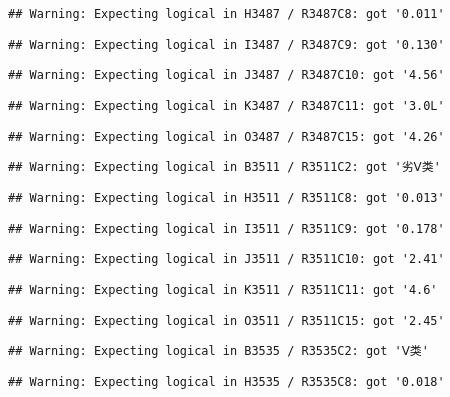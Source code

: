 \documentclass[
]{article}
\begin{document}
\begin{verbatim}
## Warning: Expecting logical in H3487 / R3487C8: got '0.011'
\end{verbatim}

\begin{verbatim}
## Warning: Expecting logical in I3487 / R3487C9: got '0.130'
\end{verbatim}

\begin{verbatim}
## Warning: Expecting logical in J3487 / R3487C10: got '4.56'
\end{verbatim}

\begin{verbatim}
## Warning: Expecting logical in K3487 / R3487C11: got '3.0L'
\end{verbatim}

\begin{verbatim}
## Warning: Expecting logical in O3487 / R3487C15: got '4.26'
\end{verbatim}

\begin{verbatim}
## Warning: Expecting logical in B3511 / R3511C2: got '劣Ⅴ类'
\end{verbatim}

\begin{verbatim}
## Warning: Expecting logical in H3511 / R3511C8: got '0.013'
\end{verbatim}

\begin{verbatim}
## Warning: Expecting logical in I3511 / R3511C9: got '0.178'
\end{verbatim}

\begin{verbatim}
## Warning: Expecting logical in J3511 / R3511C10: got '2.41'
\end{verbatim}

\begin{verbatim}
## Warning: Expecting logical in K3511 / R3511C11: got '4.6'
\end{verbatim}

\begin{verbatim}
## Warning: Expecting logical in O3511 / R3511C15: got '2.45'
\end{verbatim}

\begin{verbatim}
## Warning: Expecting logical in B3535 / R3535C2: got 'Ⅴ类'
\end{verbatim}

\begin{verbatim}
## Warning: Expecting logical in H3535 / R3535C8: got '0.018'
\end{verbatim}
\end{document}
